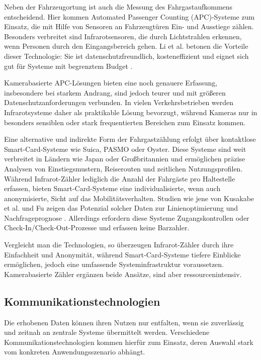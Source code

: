 Neben der Fahrzeugortung ist auch die Messung des Fahrgastaufkommens entscheidend. Hier kommen Automated Passenger Counting (APC)-Systeme zum Einsatz, die mit Hilfe von Sensoren an Fahrzeugtüren Ein- und Ausstiege zählen. Besonders verbreitet sind Infrarotsensoren, die durch Lichtstrahlen erkennen, wenn Personen durch den Eingangsbereich gehen. Li et al. betonen die Vorteile dieser Technologie: Sie ist datenschutzfreundlich, kosteneffizient und eignet sich gut für Systeme mit begrenztem Budget \cite{Li2019}.

Kamerabasierte APC-Lösungen bieten eine noch genauere Erfassung, insbesondere bei starkem Andrang, sind jedoch teurer und mit größeren Datenschutzanforderungen verbunden. In vielen Verkehrsbetrieben werden Infrarotsysteme daher als praktikable Lösung bevorzugt, während Kameras nur in besonders sensiblen oder stark frequentierten Bereichen zum Einsatz kommen.

Eine alternative und indirekte Form der Fahrgastzählung erfolgt über kontaktlose Smart-Card-Systeme wie Suica, PASMO oder Oyster. Diese Systeme sind weit verbreitet in Ländern wie Japan oder Großbritannien und ermöglichen präzise Analysen von Einstiegsmustern, Reiserouten und zeitlichen Nutzungsprofilen. Während Infrarot-Zähler lediglich die Anzahl der Fahrgäste pro Haltestelle erfassen, bieten Smart-Card-Systeme eine individualisierte, wenn auch anonymisierte, Sicht auf das Mobilitätsverhalten. Studien wie jene von Kusakabe et al. und Fu zeigen das Potenzial solcher Daten zur Linienoptimierung und Nachfrageprognose \cite{Kusakabe2010, Fu2012}. Allerdings erfordern diese Systeme Zugangskontrollen oder Check-In/Check-Out-Prozesse und erfassen keine Barzahler.

Vergleicht man die Technologien, so überzeugen Infrarot-Zähler durch ihre Einfachheit und Anonymität, während Smart-Card-Systeme tiefere Einblicke ermöglichen, jedoch eine umfassende Systeminfrastruktur voraussetzen. Kamerabasierte Zähler ergänzen beide Ansätze, sind aber ressourcenintensiv.

\subsection{Kommunikationstechnologien}

Die erhobenen Daten können ihren Nutzen nur entfalten, wenn sie zuverlässig und zeitnah an zentrale Systeme übermittelt werden. Verschiedene Kommunikationstechnologien kommen hierfür zum Einsatz, deren Auswahl stark vom konkreten Anwendungsszenario abhängt.

